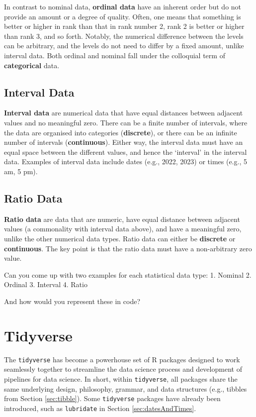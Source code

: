 \documentclass[
]{book}
\begin{document}
In contrast to nominal data, \textbf{ordinal data} have an inherent order but do not provide an amount or a degree of quality. Often, one means that something is better or higher in rank than that in rank number 2, rank 2 is better or higher than rank 3, and so forth. Notably, the numerical difference between the levels can be arbitrary, and the levels do not need to differ by a fixed amount, unlike interval data. Both ordinal and nominal fall under the colloquial term of \textbf{categorical} data.

\subsection{Interval Data}\label{sec:interval}

\textbf{Interval data} are numerical data that have equal distances between adjacent values and no meaningful zero. There can be a finite number of intervals, where the data are organised into categories (\textbf{discrete}), or there can be an infinite number of intervals (\textbf{continuous}). Either way, the interval data must have an equal space between the different values, and hence the `interval' in the interval data. Examples of interval data include dates (e.g., 2022, 2023) or times (e.g., 5 am, 5 pm).

\subsection{Ratio Data}\label{sec:ratio}

\textbf{Ratio data} are data that are numeric, have equal distance between adjacent values (a commonality with interval data above), and have a meaningful zero, unlike the other numerical data types. Ratio data can either be \textbf{discrete} or \textbf{continuous}. The key point is that the ratio data must have a non-arbitrary zero value.

Can you come up with two examples for each statistical data type:
1. Nominal
2. Ordinal
3. Interval
4. Ratio

And how would you represent these in code?

\section{Tidyverse}\label{sec:tidyverse}

The \texttt{tidyverse} has become a powerhouse set of R packages designed to work seamlessly together to streamline the data science process and development of pipelines for data science. In short, within \texttt{tidyverse}, all packages share the same underlying design, philosophy, grammar, and data structures (e.g., tibbles from Section \ref{sec:tibble}). Some \texttt{tidyverse} packages have already been introduced, such as \texttt{lubridate} in Section \ref{sec:datesAndTimes}.
\end{document}
